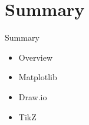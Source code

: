 \documentclass{../TexTemplate/myslide}
\begin{document}
\section{Summary}
\begin{frame}
\sectionpage
\end{frame}

\begin{frame}{Summary}
\begin{itemize}
	\item Overview
	\item Matplotlib
	\item Draw.io
	\item TikZ
\end{itemize}
\end{frame}
\end{document}
